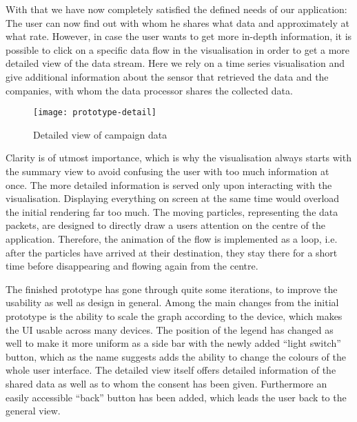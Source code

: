 \documentclass[../paper.tex]{subfiles}
\begin{document}
  With that we have now completely satisfied the defined needs of our application:
  The user can now find out with whom he shares what data and approximately at what
  rate. However, in case the user wants to get more in-depth information, it is
  possible to click on a specific data flow in the visualisation in order
  to get a more detailed view of the data stream. Here we rely on a time series
  visualisation and give additional information about the sensor that retrieved
  the data and the companies, with whom the data processor shares the collected data.
  
\begin{figure}[H]
    \centering
    \texttt{[image: prototype-detail]}
    \caption{Detailed view of campaign data}
    \label{fig:prototype-detail}
  \end{figure}
%
% 
  Clarity is of utmost importance, which is why the visualisation always starts
  with the summary view to avoid confusing the user with too much information
  at once. The more detailed information is served only upon interacting with
  the visualisation. Displaying everything on screen at the same time would
  overload the initial rendering far too much. The moving particles, representing the
  data packets, are designed to directly draw a users attention on the centre of the
  application. Therefore, the animation of the flow is implemented as a loop, i.e.
  after the particles have arrived at their destination, they stay there for a short
  time before disappearing and flowing again from the centre.

  The finished prototype has gone through quite some iterations, to improve
  the usability as well as design in general. Among the main changes from the
  initial prototype is the ability to scale the graph according to the device, which
  makes the UI usable across many devices. The position of the legend has changed
  as well to make it more uniform as a side bar with the newly added ``light switch''
  button, which as the name suggests adds the ability to change the colours of
  the whole user interface. The detailed view itself offers detailed information
  of the shared data as well as to whom the consent has been given. Furthermore
  an easily accessible ``back'' button has been added, which leads the user back
  to the general view.
\end{document}
